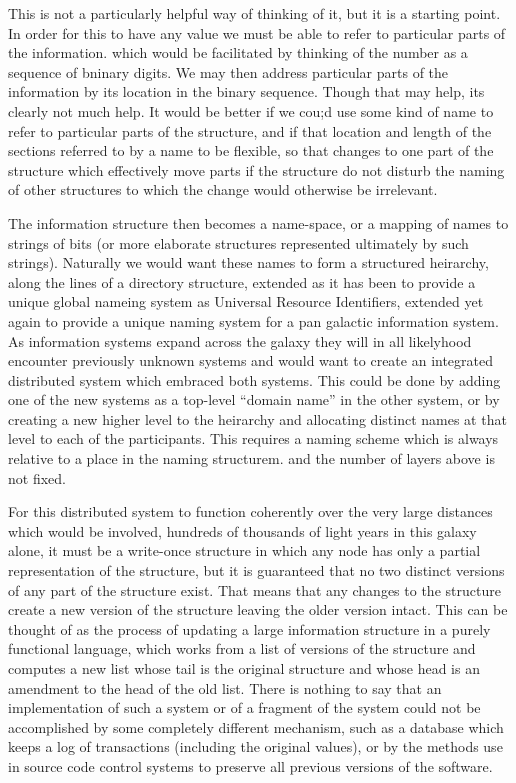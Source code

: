 \documentclass[10pt,titlepage]{article}
\begin{document}
This is not a particularly helpful way of thinking of it, but it is a starting point.
In order for this to have any value we must be able to refer to particular parts of the information. which would be facilitated by thinking of the number as a sequence of bninary digits.
We may then address particular parts of the information by its location in the binary sequence.
Though that may help, its clearly not much help.
It would be better if we cou;d use some kind of name to refer to particular parts of the structure, and if that location and length of the sections referred to by a name to be flexible, so that changes to one part of the structure which effectively move parts if the structure do not disturb the naming of other structures to which the change would otherwise be irrelevant.

The information structure then becomes a name-space, or a mapping of names to strings of bits (or more elaborate structures represented ultimately by such strings).
Naturally we would want these names to form a structured heirarchy, along the lines of a directory structure, extended as it has been to provide a unique global nameing system as Universal Resource Identifiers, extended yet again to provide a unique naming system for a pan galactic information system.
As information systems expand across the galaxy they will in all likelyhood encounter previously unknown systems and would want to create an integrated distributed system which embraced both systems.
This could be done by adding one of the new systems as a top-level ``domain name'' in the other system, or by creating a new higher level to the heirarchy and allocating distinct names at that level to each of the participants.
This requires a naming scheme which is always relative to a place in the naming structurem. and the number of layers above is not fixed.

For this distributed system to function coherently over the very large distances which would be involved, hundreds of thousands of light years in this galaxy alone, it must be a write-once structure in which any node has only a partial representation of the structure, but it is guaranteed that no two distinct versions of any part of the structure exist.
That means that any changes to the structure create a new version of the structure leaving the older version intact.
This can be thought of as the process of updating a large information structure in a purely functional language, which works from a list of versions of the structure and computes a new list whose tail is the original structure and whose head is an amendment to the head of the old list.
There is nothing to say that an implementation of such a system or of a fragment of the system could not be accomplished by some completely different mechanism, such as a database which keeps a log of transactions (including the original values), or by the methods use in source code control systems to preserve all previous versions of the software.
\end{document}
